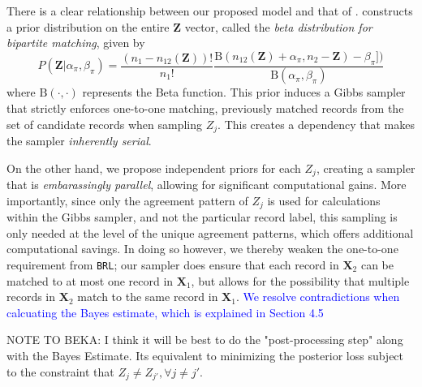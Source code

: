 \documentclass[12pt,letterpaper]{article}
\newcommand{\1}[1]{\mathbb{I}\!\left[#1\right]} %
\begin{document}
{
\color{blue}
There is a clear relationship between our proposed model and that of \cite{sadinle_bayesian_2017}. 
\cite{sadinle_bayesian_2017} constructs a prior distribution on the entire \(\mathbf{Z}\) vector, called the \emph{beta distribution for bipartite matching}, given by
$$P(\mathbf{Z}|\alpha_{\pi}, \beta_{\pi}) = \frac{(n_1 - n_{12}(\mathbf{Z}))!}{n_1 !}\frac{\text{B}(n_{12}(\mathbf{Z}) + \alpha_{\pi}, n_2 - \mathbf{Z}) - \beta_{\pi}])}{\text{B}(\alpha_{\pi}, \beta_{\pi})}
$$
where $\text{B}(\cdot, \cdot)$ represents the Beta function. This prior induces a Gibbs sampler that strictly enforces one-to-one matching,  previously matched records from the set of candidate
records when sampling \(Z_j\). This creates a dependency that makes the
sampler \emph{inherently serial}. 

On the other hand, we propose independent priors for each \(Z_j\), creating a sampler that is \emph{embarassingly parallel}, allowing for significant computational gains. More importantly, since only the agreement pattern of \(Z_j\) is used for
calculations within the Gibbs sampler, and not the particular record
label, this sampling is only needed at the level of the unique agreement patterns, which offers additional computational savings.  In doing so however, we thereby weaken the one-to-one requirement from
\texttt{BRL}; our sampler does ensure that each record in \(\bm{X}_2\) can be
matched to at most one record in \(\bm{X}_1\), but allows for the possibility
that multiple records in \(\bm{X}_2\) match to the same record in \(\bm{X}_1\). \textcolor{blue}{We resolve contradictions when calcuating the Bayes estimate, which is explained in Section 4.5}

NOTE TO BEKA: I think it will be best to do the "post-processing step" along with the Bayes Estimate. Its equivalent to minimizing the posterior loss subject to the constraint that $Z_j \neq Z_{j'}, \forall j \neq j'$.
}


\newpage


\end{document}
